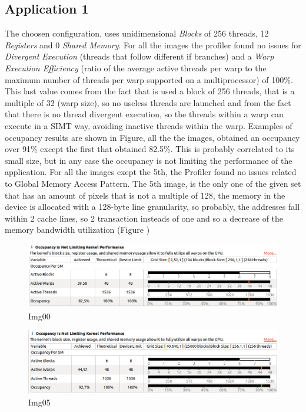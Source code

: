 \documentclass[a4paper]{article}
\begin{document}
\subsection{Application 1}
\label{sec:a1}
 The choosen configuration, uses unidimensional \textit{Blocks} of 256 threads, 12 \textit{Registers} and 0 \textit{Shared Memory}. For all the images the profiler found no issues for \textit{Divergent Execution} (threads that follow different if branches) and a \textit{Warp Execution Efficiency} (ratio of the average active threads per warp to the maximum number of threads per warp supported on a multiprocessor) of 100\%. This last value comes from the fact that is used a block of 256 threads, that is a multiple of 32 (warp size), so no useless threads are launched and from the fact that there is no thread divergent execution, so the threads within a warp can execute in a SIMT way, avoiding inactive threads within the warp. Examples of occupancy results are shown in Figure, all the the images, obtained an occupancy over 91\% except the first that obtained 82.5\%. This is probably correlated to its small size, but in any case the occupancy is not limiting the performance of the application. For all the images exept the 5th, the Profiler found no issues related to Global Memory Access Pattern. The 5th image, is the only one of the given set that has an amount of pixels that is not a multiple of 128, the memory in the device is allocated with a 128-byte line granularity, so probably, the addresses fall within 2 cache lines, so 2 transaction insteads of one and so a decrease of the memory bandwidth utilization (Figure )

\begin{figure}[!ht]
    \centering
    \includegraphics[width=0.7\linewidth]{profiling/darker/darker_occupancy_00}
    \caption{Img00}
    \label{fig:occ00}
\end{figure}
\FloatBarrier

\begin{figure}[!ht]
    \centering
    \includegraphics[width=0.7\linewidth]{profiling/darker/darker_06_occupancy}
    \caption{Img05}
    \label{fig:occ06}
\end{figure}
\FloatBarrier
\end{document}

